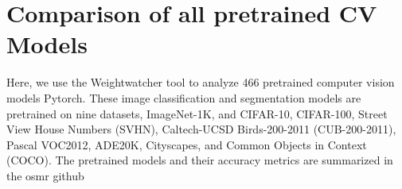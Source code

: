 \section{Comparison of all pretrained CV Models}
\label{sxn:all_cv_models}


Here, we use the Weightwatcher tool to analyze 466 pretrained computer vision models Pytorch. These image classification and segmentation models are pretrained on nine datasets, ImageNet-1K, and CIFAR-10, CIFAR-100, Street View House Numbers (SVHN), Caltech-UCSD Birds-200-2011 (CUB-200-2011), Pascal VOC2012, ADE20K, Cityscapes, and Common Objects in Context (COCO). The pretrained models and their accuracy metrics are summarized in the osmr github 



